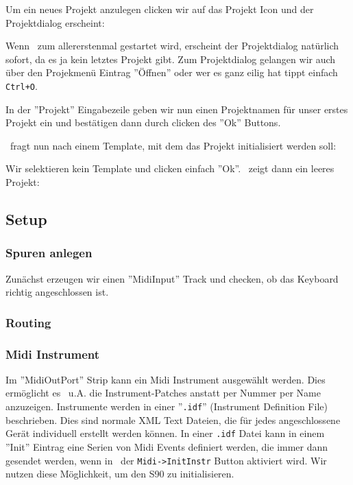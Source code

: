       Um ein neues Projekt anzulegen clicken wir auf das Projekt
      Icon und der Projektdialog erscheint:


      Wenn \M\ zum allererstenmal gestartet wird, erscheint der
      Projektdialog natürlich sofort, da es ja kein letztes Projekt
      gibt. Zum Projektdialog gelangen wir auch über den Projekmenü
      Eintrag ''Öffnen'' oder wer es ganz eilig hat tippt einfach
      {\tt Ctrl+O}.

      In der ''Projekt'' Eingabezeile geben wir nun einen Projektnamen
      für unser erstes Projekt ein und bestätigen dann durch clicken
      des ''Ok'' Buttons.

      \M\ fragt nun nach einem Template, mit dem das Projekt
      initialisiert werden soll:


      Wir selektieren kein Template und clicken einfach ''Ok''.
      \M\ zeigt dann ein leeres Projekt:


   \subsection{Setup}

      \subsubsection{Spuren anlegen}

      Zunächst erzeugen wir einen ''MidiInput'' Track und checken,
      ob das Keyboard richtig angeschlossen ist.

      \subsubsection{Routing}

      \subsubsection{Midi Instrument}
      Im ''MidiOutPort'' Strip kann ein Midi Instrument ausgewählt werden.
      Dies ermöglicht es \M\ u.A. die Instrument-Patches anstatt per Nummer 
      per Name anzuzeigen. Instrumente werden in einer ''{\tt *.idf}''
      (Instrument Definition File) beschrieben. Dies sind normale XML Text
      Dateien, die für jedes angeschlossene Gerät individuell erstellt werden
      können. In einer {\tt *.idf} Datei kann in einem ''Init'' Eintrag eine
      Serien von Midi Events definiert werden, die immer dann gesendet werden,
      wenn in \M\ der {\tt Midi->InitInstr} Button aktiviert wird. Wir nutzen diese
      Möglichkeit, um den S90 zu initialisieren.

